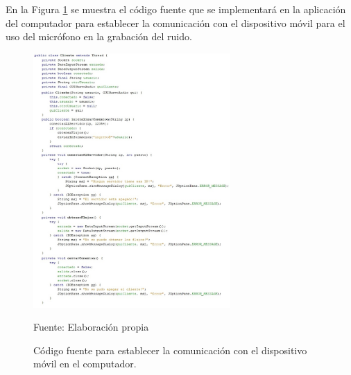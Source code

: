 En la Figura \ref{fig:figura3.64} se muestra el código fuente que se implementará en la aplicación del computador para establecer la comunicación con el dispositivo móvil para el uso del micrófono en la grabación del ruido.
\begin{figure}[H]
\captionsetup{justification=centering}
\begin{center}
\includegraphics[width=0.67\textwidth]{Imagenes/Cap3/image064}
\end{center}
\begin{center}
\vskip -0.5cm
\caption{\small{Código fuente para establecer la comunicación con el dispositivo móvil en el computador.}}
\label{fig:figura3.64}
{\small{Fuente: Elaboración propia}}
\end{center}
\end{figure}

